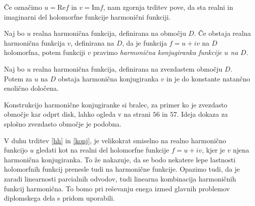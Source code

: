 \documentclass[mat1, tisk]{fmfdelo}
\begin{document}
    \begin{opomba}
        Če označimo $u = \text{Re}{f}$ in $v = \text{Im}{f}$, nam zgornja trditev pove, da sta realni in imaginarni del holomorfne funkcije harmonični funkciji. 
    \end{opomba}

    \begin{definicija}
        Naj bo $u$ realna harmonična funkcija, definirana na območju $D$. Če obstaja realna harmonična funkcija $v$, definirana na $D$, da je funkcija $f = u + iv$ na $D$ holomorfna, potem funkciji $v$ pravimo \emph{harmonična konjugiranka funkcije $u$ na $D$}.    
    \end{definicija}

    \begin{trditev}
        \label{konj}
        Naj bo $u$ realna harmonična funkcija, definirana na zvezdastem območju $D$. Potem za $u$ na $D$ obstaja harmonična konjugiranka $v$ in je do konstante natančno enolično določena. 
    \end{trditev}
    \begin{dokaz}
        Konstrukcijo harmonične konjugiranke si bralec, za primer ko je zvezdasto območje kar odprt disk, lahko ogleda v \cite{osnova} na strani $56$ in $57$. 
        Ideja dokaza za splošno zvezdasto območje je podobna. 
    \end{dokaz}

    V duhu trditev \ref{hh} in \ref{konj}, je velikokrat smiselno na realno harmonično funkcijo $u$ gledati kot na realni del holomorfne funkcije $f = u + iv$, kjer je $v$ njena harmonična konjugiranka. To že nakazuje, da se bodo nekatere lepe lastnosti holomorfnih funkcij prenesle tudi na harmonične funkcije.
    Opazimo tudi, da je zaradi linearnosti parcialnih odvodov, tudi linearna kombinacija harmoničnih funkcij harmonična. To bomo pri reševanju enega izmed glavnih problemov diplomskega dela s pridom uporabili.
\end{document}
